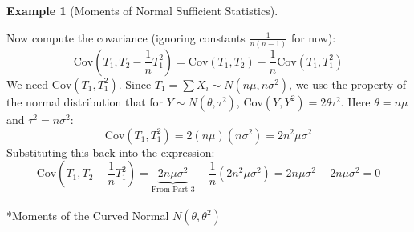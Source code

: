 \documentclass[
  letterpaper,
  DIV=11,
  numbers=noendperiod]{scrreprt}
\makeatletter
\let\oldparagraph\paragraph
\renewcommand{\paragraph}{
    \@ifstar
      \xxxParagraphStar
      \xxxParagraphNoStar
  }
\newcommand{\xxxParagraphStar}[1]{\oldparagraph*{#1}\mbox{}}
\newcommand{\xxxParagraphNoStar}[1]{\oldparagraph{#1}\mbox{}}
\renewcommand{\[}{\begin{equation}}
\renewcommand{\]}{\end{equation}}
\theoremstyle{definition}
\theoremstyle{plain}
\theoremstyle{plain}
\theoremstyle{plain}
\theoremstyle{definition}
\newtheorem{example}{Example}[chapter]
\theoremstyle{plain}
\theoremstyle{remark}
\makeatother
\begin{document}
\begin{example}[Moments of Normal Sufficient
Statistics]
\begin{enumerate}
  Now compute the covariance (ignoring constants \(\frac{1}{n(n-1)}\)
  for now): \[
   \text{Cov}\left(T_1, T_2 - \frac{1}{n}T_1^2\right) = \text{Cov}(T_1, T_2) - \frac{1}{n} \text{Cov}(T_1, T_1^2)
   \] We need \(\text{Cov}(T_1, T_1^2)\). Since
  \(T_1 = \sum X_i \sim N(n\mu, n\sigma^2)\), we use the property of the
  normal distribution that for \(Y \sim N(\theta, \tau^2)\),
  \(\text{Cov}(Y, Y^2) = 2\theta \tau^2\). Here \(\theta = n\mu\) and
  \(\tau^2 = n\sigma^2\): \[
   \text{Cov}(T_1, T_1^2) = 2(n\mu)(n\sigma^2) = 2n^2\mu\sigma^2
   \] Substituting this back into the expression: \[
   \text{Cov}\left(T_1, T_2 - \frac{1}{n}T_1^2\right) = \underbrace{2n\mu\sigma^2}_{\text{From Part 3}} - \frac{1}{n} (2n^2\mu\sigma^2) = 2n\mu\sigma^2 - 2n\mu\sigma^2 = 0
   \]
\end{enumerate}

\end{example}

\paragraph*{\texorpdfstring{Moments of the Curved Normal
\(N(\theta, \theta^2)\)}{Moments of the Curved Normal N(\textbackslash theta, \textbackslash theta\^{}2)}}\label{moments-of-the-curved-normal-ntheta-theta2}
\end{document}
